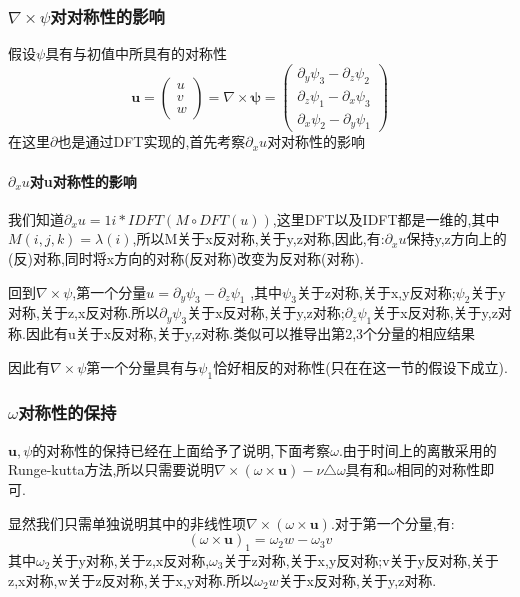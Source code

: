 \documentclass[UTF8]{ctexart}
\begin{document}
\subsubsection{$\nabla \times \psi$对对称性的影响}
假设$\psi$具有与初值中所具有的对称性
\begin{equation*}
\mathbf{u} = \left(\begin{matrix}
                          u \\
                          v \\
                          w
                        \end{matrix}\right) =\nabla \times \mathbf{\psi}
                        =\left(\begin{matrix}
                          \partial_y \psi_3 -\partial_z \psi_2 \\
                          \partial_z \psi_1 -\partial_x \psi_3 \\
                          \partial_x \psi_2 -\partial_y \psi_1
                        \end{matrix}\right)
\end{equation*}
在这里$\partial$也是通过DFT实现的,首先考察$\partial_x u$对对称性的影响
\paragraph{$\partial_x u$对u对称性的影响}
我们知道$\partial_x u = 1i *IDFT ( M\circ DFT(u) )$,这里DFT以及IDFT都是一维的,其中$M(i,j,k)= \lambda(i)$,所以M关于x反对称,关于y,z对称,因此,有:$\partial_x u$保持y,z方向上的(反)对称,同时将x方向的对称(反对称)改变为反对称(对称).

回到$\nabla \times \psi$,第一个分量$u=\partial_y \psi_3 -\partial_z \psi_1$ ,其中$\psi_3$关于z对称,关于x,y反对称;$\psi_2$关于y对称,关于z,x反对称.所以$\partial_y \psi_3$关于x反对称,关于y,z对称;$\partial_z \psi_1$关于x反对称,关于y,z对称.因此有u关于x反对称,关于y,z对称.类似可以推导出第2,3个分量的相应结果

因此有$\nabla \times \psi$第一个分量具有与$\psi_1$恰好相反的对称性(只在在这一节的假设下成立).
\subsubsection{$\omega$对称性的保持}
$\mathbf{u},\psi$的对称性的保持已经在上面给予了说明,下面考察$\omega$.由于时间上的离散采用的Runge-kutta方法,所以只需要说明$\nabla\times(\omega\times \mathbf{u}) - \nu \triangle \omega$具有和$\omega$相同的对称性即可.

显然我们只需单独说明其中的非线性项$\nabla\times(\omega\times \mathbf{u})$.对于第一个分量,有:
$$(\omega\times \mathbf{u})_1 = \omega_2w-\omega_3v$$
其中$\omega_2$关于y对称,关于z,x反对称,$\omega_3$关于z对称,关于x,y反对称;v关于y反对称,关于z,x对称,w关于z反对称,关于x,y对称.所以$\omega_2w$关于x反对称,关于y,z对称.
\end{document}
